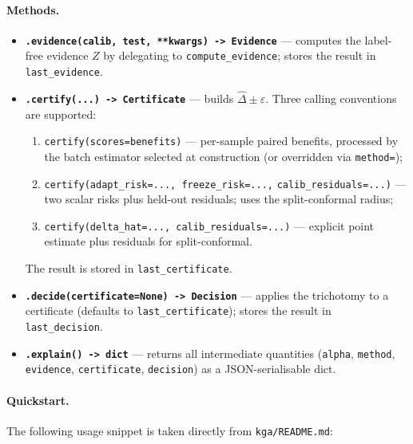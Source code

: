 \paragraph{Methods.}

\begin{itemize}
  \item \textbf{\texttt{.evidence(calib, test, **kwargs) -> Evidence}} ---
    computes the label-free evidence $Z$ by delegating to
    \texttt{compute\_evidence}; stores the result in \texttt{last\_evidence}.

  \item \textbf{\texttt{.certify(...) -> Certificate}} --- builds $\widehat\Delta
    \pm \varepsilon$.  Three calling conventions are supported:
    \begin{enumerate}
      \item \texttt{certify(scores=benefits)} --- per-sample paired benefits,
        processed by the batch estimator selected at construction (or overridden
        via \texttt{method=});
      \item \texttt{certify(adapt\_risk=..., freeze\_risk=...,}
        \texttt{calib\_residuals=...)} --- two scalar risks plus held-out
        residuals; uses the split-conformal radius;
      \item \texttt{certify(delta\_hat=..., calib\_residuals=...)} --- explicit
        point estimate plus residuals for split-conformal.
    \end{enumerate}
    The result is stored in \texttt{last\_certificate}.

  \item \textbf{\texttt{.decide(certificate=None) -> Decision}} --- applies the
    trichotomy to a certificate (defaults to \texttt{last\_certificate}); stores
    the result in \texttt{last\_decision}.

  \item \textbf{\texttt{.explain() -> dict}} --- returns all intermediate
    quantities (\texttt{alpha}, \texttt{method}, \texttt{evidence},
    \texttt{certificate}, \texttt{decision}) as a JSON-serialisable dict.
\end{itemize}

\paragraph{Quickstart.}
The following usage snippet is taken directly from \texttt{kga/README.md}:


